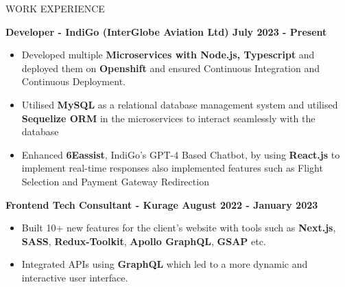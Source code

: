 \documentclass{resume} %
\begin{document}







\begin{rSection}{WORK EXPERIENCE}

{\bf Developer - IndiGo (InterGlobe Aviation Ltd)  \hfill July 2023 - Present }
\begin{itemize}

    \item {\normalfont Developed multiple \textbf{Microservices with Node.js, Typescript} and deployed them on \textbf{Openshift} and ensured Continuous Integration and Continuous Deployment.}
    \item {\normalfont Utilised \textbf{MySQL} as a relational database management system and utilised \textbf{Sequelize ORM} in the microservices to interact seamlessly with the database}
   \item {\normalfont Enhanced \textbf{6Eassist}, IndiGo's GPT-4 Based Chatbot, by using \textbf{React.js} to implement real-time responses also implemented features such as Flight Selection and Payment Gateway Redirection} 
   
 
\end{itemize}


{\bf Frontend Tech Consultant - Kurage  \hfill August 2022 - January 2023 }
\begin{itemize}

    \item {\normalfont  Built 10+ new features for the client's website with tools such as \textbf{{Next.js}}, \textbf{{SASS}}, \textbf{{Redux-Toolkit}}, \textbf{{Apollo GraphQL}}, \textbf{{GSAP}} etc. }
   \item {\normalfont Integrated APIs using \textbf{{GraphQL}} which led to a more dynamic and interactive user interface.} 
 
\end{itemize}

\end{rSection}


\end{document}
